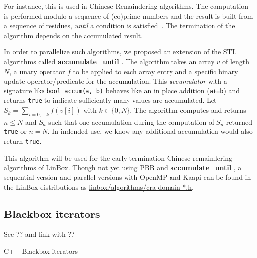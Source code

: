 \documentclass{article}
\newcommand{\linbox}{{\sc LinBox}\xspace}
\newcommand{\kaapi}{{\sc Kaapi}\xspace}
\newcommand{\accumulatewhile}{ \textbf{accumulate\_until} }
\newcommand{\Accumulatewhile}{ \textbf{Accumulate\_until} }
\begin{document}
For instance, this is used in Chinese Remaindering algorithms. The
computation is performed modulo a sequence of (co)prime numbers and
the result is built from a sequence of residues, {\em until} a
condition is satisfied~\cite{jgd:2010:crt}. 
The termination of the algorithm depends on the accumulated 
result.
  
In order to parallelize such algorithms, we proposed an extension of
the STL algorithms called \accumulatewhile.
The algorithm takes an array $v$ of length $N$, a unary
operator $f$ to be applied to each array entry and a specific binary
update operator/predicate for the accumulation.
This {\em accumulator} with a signature like \verb!bool accum(a, b)! behaves like an in place addition (\verb!a+=b!) and
returns \texttt{true} to indicate sufficiently many values are accumulated.
Let $S_k = \sum_{i=0,..,k} f( v[i])$ with 
$k \in \{0,N\}$.  The algorithm computes and returns $n \leq N$ and
$S_n$ such that one accumulation during the computation of $S_n$
returned \texttt{true} or $n = N$.  In indended use, we know any additional accumulation would also return \texttt{true}.

This algorithm will be used 
for the early termination Chinese remaindering algorithms of
\linbox. Though not yet using PBB and \accumulatewhile, a
sequential version and parallel versions with OpenMP and
\kaapi can be found in the \linbox distributions as 
\url{linbox/algorithms/cra-domain-*.h}.


\subsection{Blackbox iterators}

See \cite[\S 11.3]{jgd:2000:these} ?? 
and link with \cite{jgd:2010:ffspmvgpu} ??

\begin{algorithm}[ht]
\caption{C++ Blackbox iterators}\label{alg:bbit}
\end{algorithm}
\end{document}
